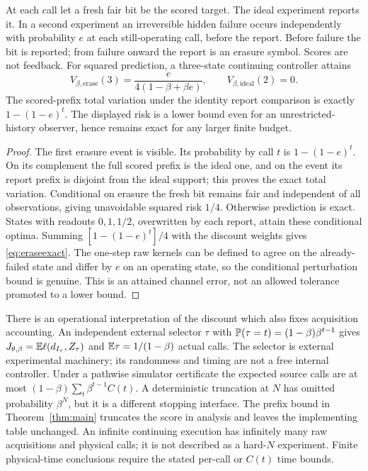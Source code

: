 \begin{proposition}\label{prop:erasure}
At each call let a fresh fair bit be the scored target. The ideal experiment reports it. In a second experiment an irreversible hidden failure occurs independently with probability $e$ at each still-operating call, before the report. Before failure the bit is reported; from failure onward the report is an erasure symbol. Scores are not feedback. For squared prediction, a three-state continuing controller attains
\begin{equation}\label{eq:eraseexact}
 V_{\beta,\mathrm{erase}}(3)=\frac{e}{4(1-\beta+\beta e)},
 \qquad V_{\beta,\mathrm{ideal}}(2)=0.
\end{equation}
The scored-prefix total variation under the identity report comparison is exactly $1-(1-e)^t$. The displayed risk is a lower bound even for an unrestricted-history observer, hence remains exact for any larger finite budget.
\end{proposition}
\begin{proof}
The first erasure event is visible. Its probability by call $t$ is $1-(1-e)^t$. On its complement the full scored prefix is the ideal one, and on the event its report prefix is disjoint from the ideal support; this proves the exact total variation. Conditional on erasure the fresh bit remains fair and independent of all observations, giving unavoidable squared risk $1/4$. Otherwise prediction is exact. States with readouts $0,1,1/2$, overwritten by each report, attain these conditional optima. Summing $[1-(1-e)^t]/4$ with the discount weights gives \eqref{eq:eraseexact}. The one-step raw kernels can be defined to agree on the already-failed state and differ by $e$ on an operating state, so the conditional perturbation bound is genuine. This is an attained channel error, not an allowed tolerance promoted to a lower bound.
\end{proof}

There is an operational interpretation of the discount which also fixes acquisition accounting. An independent external selector $\tau$ with
$\mathbb P(\tau=t)=(1-\beta)\beta^{t-1}$ gives
$J_{\theta,\beta}=\mathbb E\ell(d_{I_\tau},Z_\tau)$ and
$\mathbb E\tau=1/(1-\beta)$ actual calls. The selector is external experimental machinery; its randomness and timing are not a free internal controller. Under a pathwise simulator certificate the expected source calls are at most
$(1-\beta)\sum_t\beta^{t-1}C(t)$.
A deterministic truncation at $N$ has omitted probability $\beta^N$, but it is a different stopping interface. The prefix bound in Theorem~\ref{thm:main} truncates the score in analysis and leaves the implementing table unchanged. An infinite continuing execution has infinitely many raw acquisitions and physical calls; it is not described as a hard-$N$ experiment. Finite physical-time conclusions require the stated per-call or $C(t)$ time bounds.
